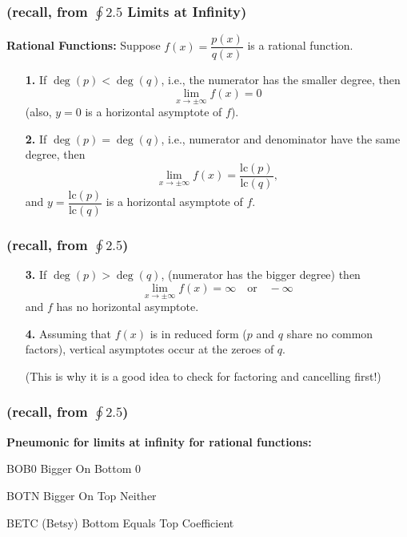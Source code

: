\documentclass[14pt]{beamer}
\begin{document}
\begin{frame}
\frametitle{(recall, from $\oint 2.5$ Limits at Infinity)}
\footnotesize
{\bf Rational Functions:}  Suppose $f(x)=\dfrac{p(x)}{q(x)}$ is a rational function.

\begin{itemize}
\item[{\bf 1.}] If $\deg(p)<\deg(q)$, i.e., \alert{the numerator has the smaller degree}, then 
\[\lim_{x\to\pm\infty}f(x)=0\] 
(also, $y=0$ is a horizontal asymptote of $f$).

\vspace{2pc}
\item[{\bf 2.}] If $\deg(p)=\deg(q)$, i.e., \alert{numerator and denominator have the same degree}, then 
\[\lim_{x\to\pm\infty}f(x)=\dfrac{\text{lc}(p)}{\text{lc}(q)},\] 
and $y=\dfrac{\text{lc}(p)}{\text{lc}(q)}$ is a horizontal asymptote of $f$.
\end{itemize}
\end{frame}

\begin{frame}
\frametitle{(recall, from $\oint 2.5$)}
\begin{itemize}
\small
\item[{\bf 3.}] If $\deg(p)>\deg(q)$, \alert{(numerator has the bigger degree)} then 
\[\lim_{x\to\pm\infty}f(x)=\infty\quad\text{or}\quad -\infty\] 
and $f$ has no horizontal asymptote.

\vspace{2pc}
\item[{\bf 4.}] Assuming that $f(x)$ is in \alert{reduced form} ($p$ and $q$ share no common factors), vertical asymptotes occur at the zeroes of $q$.  

\vspace{1pc}
(This is why it is a good idea to check for factoring and cancelling first!)
\end{itemize}
\end{frame}

\begin{frame}
\frametitle{(recall, from $\oint 2.5$)}
\small
{\bf Pneumonic for limits at infinity for rational functions:}
\begin{block}
{BOB0}
\alert{B}igger \alert{O}n \alert{B}ottom \alert{0}
\end{block}
\begin{block}
{BOTN}
\alert{B}igger \alert{O}n \alert{T}op \alert{N}either
\end{block}
\begin{block}
{BETC (Betsy)}
\alert{B}ottom \alert{E}quals \alert{T}op \alert{C}oefficient
\end{block}
\end{frame}
\end{document}
